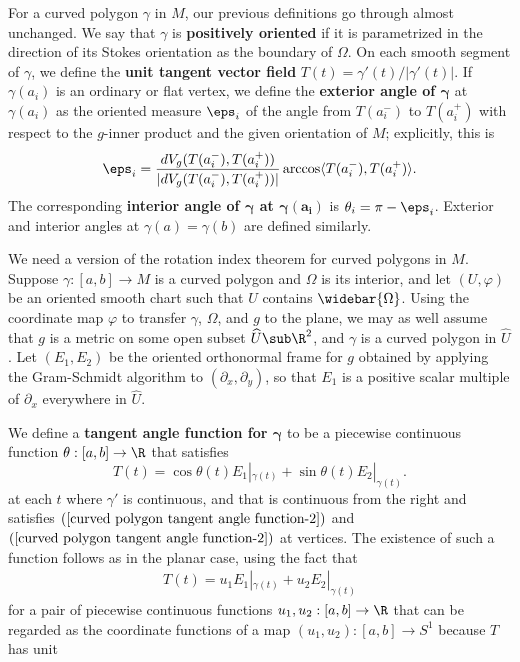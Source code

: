 For a curved polygon $\gamma$ in $M$, our previous definitions go through almost unchanged. We say that $\gamma$ is \textbf{positively oriented} if it is parametrized in 
the direction of its Stokes orientation as the boundary of $\Omega$. On each smooth segment of $\gamma$, we define the \textbf{unit tangent vector field} 
$T(t)=\gamma'(t)/|\gamma'(t)|$. If $\gamma(a_i)$ is an ordinary or flat vertex, we define the \textbf{exterior angle of $\bm{\gamma}$} at $\gamma(a_i)$ as the oriented 
measure $\eps_i$ of the angle from $T(a_i^{-})$ to $T(a_i^{+})$ with respect to the $g$-inner product and the given orientation of $M$; explicitly, this is
\begin{align}\label{Riemann exterior angle}
\eps_i=\frac{dV_g(T(a_i^{-}),T(a_i^{+}))}{|dV_g(T(a_i^{-}),T(a_i^{+}))|}\arccos\langle T(a_i^{-}),T(a_i^{+})\rangle.
\end{align}
The corresponding \textbf{interior angle of $\bm{\gamma}$ at $\bm{\gamma(a_i)}$} is $\theta_i=\pi-\eps_i$. Exterior and interior angles at $\gamma(a)=\gamma(b)$ are 
defined similarly.\par
We need a version of the rotation index theorem for curved polygons in $M$. Suppose $\gamma:[a,b]\to M$ is a curved polygon and $\Omega$ is its interior, and let $(U,\varphi)$ be an oriented smooth chart such that $U$ contains $\widebar{\Omega}$. Using the coordinate map $\varphi$ to transfer $\gamma$, $\Omega$, and $g$ to the plane, we may as well assume that $g$ is a metric on some open subset $\widehat{U}\sub\R^2$, and $\gamma$ is a curved polygon in $\widehat{U}$. Let $(E_1,E_2)$ be the oriented orthonormal frame for $g$ obtained by applying the Gram-Schmidt algorithm to $(\partial_x,\partial_y)$, so that $E_1$ is a positive scalar multiple of $\partial_x$ everywhere in $\widehat{U}$.\par
We define a \textbf{tangent angle function for $\bm{\gamma}$} to be a piecewise continuous function $\theta:[a,b]\to\R$ that satisfies
\[T(t)=\cos\theta(t) E_1|_{\gamma(t)}+\sin\theta(t)E_2|_{\gamma(t)}.\]
at each $t$ where $\gamma'$ is continuous, and that is continuous from the right and satisfies $(\ref{curved polygon tangent angle function-2})$ and 
$(\ref{curved polygon tangent angle function-2})$ at vertices. The existence of such a function follows as in the planar case, using the fact that
\begin{align*}
T(t)=u_1E_1|_{\gamma(t)}+u_2E_2|_{\gamma(t)}
\end{align*}
for a pair of piecewise continuous functions $u_1,u_2:[a,b]\to\R$ that can be regarded as the coordinate functions of a map $(u_1,u_2):[a,b]\to S^1$ because $T$ has unit 
